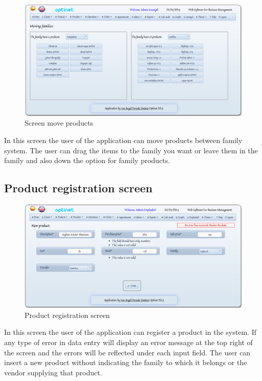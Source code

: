 \documentclass[a4paper,11pt]{book}
\begin{document}
\begin{figure}[!htb]
  \centering
    \includegraphics[scale=0.35]{icapmoverproductos.png}
  \caption{Screen move products}
  \label{a}
\end{figure}

In this screen the user of the application can move products between family system. The user can drag the items to the family you want or leave them in the family and also down the option for family products.

\subsection {Product registration screen}

\begin{figure}[!htb]
  \centering
    \includegraphics[scale=0.35]{icapregistroproducto.png}
  \caption{Product registration screen}
  \label{a}
\end{figure}

In this screen the user of the application can register a product in the system. If any type of error in data entry will display an error message at the top right of the screen and the errors will be reflected under each input field. The user can insert a new product without indicating the family to which it belongs or the vendor supplying that product.
\end{document}
